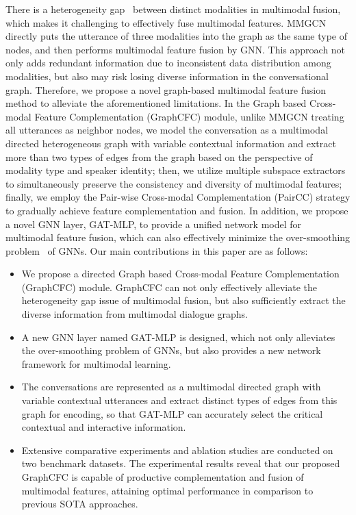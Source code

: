 \documentclass[lettersize,journal]{IEEEtran}
\begin{document}
There is a heterogeneity gap~\cite{guo2019dmrl,hazarika2020misa} between distinct modalities in multimodal fusion, which makes it challenging to effectively fuse multimodal features. MMGCN directly puts the utterance of three modalities into the graph as the same type of nodes, and then performs multimodal feature fusion by GNN. This approach not only adds redundant information due to inconsistent data distribution among modalities, but also may risk losing diverse information in the conversational graph. Therefore, we propose a novel graph-based multimodal feature fusion method to alleviate the aforementioned limitations. In the Graph based Cross-modal Feature Complementation (GraphCFC) module, unlike MMGCN treating all utterances as neighbor nodes, we model the conversation as a multimodal directed heterogeneous graph with variable contextual information and extract more than two types of edges from the graph based on the perspective of modality type and speaker identity; then, we utilize multiple subspace extractors to simultaneously preserve the consistency and diversity of multimodal features; finally, we employ the Pair-wise Cross-modal Complementation (PairCC) strategy to gradually achieve feature complementation and fusion. In addition, we propose a novel GNN layer, GAT-MLP, to provide a unified network model for multimodal feature fusion, which can also effectively minimize the over-smoothing problem~\cite{li2018deeper} of GNNs. Our main contributions in this paper are as follows:
\begin{itemize}
\item[\ding{172}] We propose a directed Graph based Cross-modal Feature Complementation (GraphCFC) module. GraphCFC can not only effectively alleviate the heterogeneity gap issue of multimodal fusion, but also sufficiently extract the diverse information from multimodal dialogue graphs.
\item[\ding{173}] A new GNN layer named GAT-MLP is designed, which not only alleviates the over-smoothing problem of GNNs, but also provides a new network framework for multimodal learning.
\item[\ding{174}] The conversations are represented as a multimodal directed graph with variable contextual utterances and extract distinct types of edges from this graph for encoding, so that GAT-MLP can accurately select the critical contextual and interactive information.
\item[\ding{175}] Extensive comparative experiments and ablation studies are conducted on two benchmark datasets. The experimental results reveal that our proposed GraphCFC is capable of productive complementation and fusion of multimodal features, attaining optimal performance in comparison to previous SOTA approaches.
\end{itemize}
\end{document}
